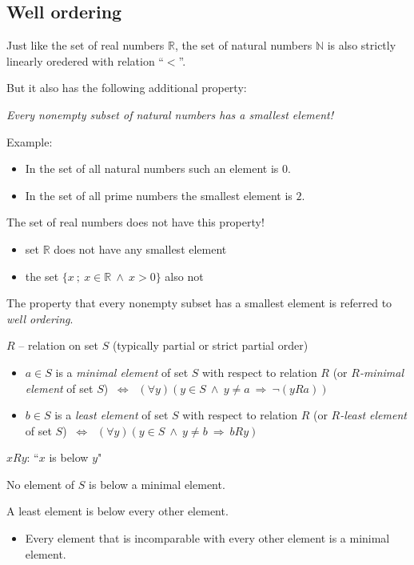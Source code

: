 \documentclass[11pt,paper=b5,footinclude,headinclude]{scrbook} %
\def\inn {{~\wedge~}}
\def\sledi {{~\Rightarrow~}}
\def\cee {{~\Leftrightarrow~}}
\theoremstyle{remark}
\theoremstyle{definition} %
\theoremstyle{theorem} %
\begin{document}
\subsection{Well ordering}

Just like the set of real numbers $\mathbb{R}$, the set of natural numbers $\mathbb{N}$
is also strictly linearly oredered with relation ``$<$''.

But it also has the following additional property:

{\em Every nonempty subset of natural numbers has a smallest element!}

Example:
\begin{itemize}
 \item In the set of all natural numbers such an element is $0$.
  \item In the set of all prime numbers the smallest element is $2$.
\end{itemize}

The set of real numbers does not have this property!
\begin{itemize}
  \item set $\mathbb{R}$ does not have any smallest element
  \item the set $\{x~;~x\in \mathbb{R} \inn x> 0\}$ also not
\end{itemize}

\bigskip
The property that every nonempty subset has a smallest element is referred to {\em well ordering}.

\bigskip
$R$ -- relation  on set  $S$ (typically partial or strict partial order)
\begin{itemize}
  \item $a\in S$ is a {\em minimal element} of set  $S$ with respect to relation $R$ (or {\em $R$-minimal element} of set $S$) $\cee$ $(\forall y)(y\in S\inn y\neq a\sledi \neg (yRa))$
  \item $b\in S$ is a {\em least element} of set $S$ with respect to relation $R$ (or {\em $R$-least element} of set $S$) $\cee$ $(\forall y)(y\in S\inn y\neq b\sledi bRy)$
\end{itemize}

\bigskip
$xRy$: ``$x$ is below $y$"~

\medskip
No element of $S$ is below a minimal element.

A least element is below  every other element.

\begin{itemize}
  \item Every element that is incomparable with every other element is a minimal element.
\end{itemize}
\end{document}
